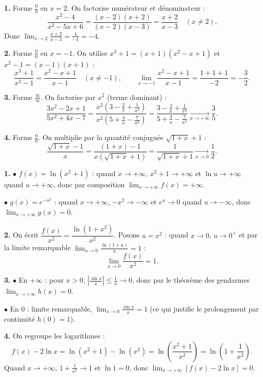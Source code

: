 \documentclass[11pt]{article}
\begin{document}
\begin{corrige}
\textbf{1.} Forme $\frac{0}{0}$ en $x = 2$. On factorise numérateur et dénominateur :
\[ \frac{x^2 - 4}{x^2 - 5x + 6} = \frac{(x-2)(x+2)}{(x-2)(x-3)} = \frac{x+2}{x-3} \quad (x \neq 2). \]
Donc $\displaystyle \lim_{x \to 2} \frac{x+2}{x-3} = \frac{4}{-1} = \boxed{-4}$.

\textbf{2.} Forme $\frac{0}{0}$ en $x = -1$. On utilise $x^3 + 1 = (x+1)(x^2 - x + 1)$ et $x^2 - 1 = (x-1)(x+1)$ :
\[ \frac{x^3 + 1}{x^2 - 1} = \frac{x^2 - x + 1}{x - 1} \quad (x \neq -1), \qquad \lim_{x \to -1} \frac{x^2 - x + 1}{x - 1} = \frac{1 + 1 + 1}{-2} = \boxed{-\frac{3}{2}}. \]

\textbf{3.} Forme $\frac{\infty}{\infty}$. On factorise par $x^2$ (terme dominant) :
\[ \frac{3x^2 - 2x + 1}{5x^2 + 4x - 7} = \frac{x^2\left(3 - \frac{2}{x} + \frac{1}{x^2}\right)}{x^2\left(5 + \frac{4}{x} - \frac{7}{x^2}\right)} = \frac{3 - \frac{2}{x} + \frac{1}{x^2}}{5 + \frac{4}{x} - \frac{7}{x^2}} \xrightarrow[x \to +\infty]{} \boxed{\frac{3}{5}}. \]

\textbf{4.} Forme $\frac{0}{0}$. On multiplie par la quantité conjuguée $\sqrt{1+x} + 1$ :
\[ \frac{\sqrt{1+x} - 1}{x} = \frac{(1+x) - 1}{x\left(\sqrt{1+x} + 1\right)} = \frac{1}{\sqrt{1+x} + 1} \xrightarrow[x \to 0]{} \boxed{\frac{1}{2}}. \]
\end{corrige}

\begin{corrige}
\textbf{1.} $\bullet$ $f(x) = \ln(x^2+1)$ : quand $x \to +\infty$, $x^2 + 1 \to +\infty$ et $\ln u \to +\infty$ quand $u \to +\infty$, donc par composition $\boxed{\lim_{x \to +\infty} f(x) = +\infty}$.

$\bullet$ $g(x) = e^{-x^2}$ : quand $x \to +\infty$, $-x^2 \to -\infty$ et $e^u \to 0$ quand $u \to -\infty$, donc $\boxed{\lim_{x \to +\infty} g(x) = 0}$.

\textbf{2.} On écrit $\dfrac{f(x)}{x^2} = \dfrac{\ln(1 + x^2)}{x^2}$. Posons $u = x^2$ : quand $x \to 0$, $u \to 0^+$ et par la limite remarquable $\lim_{u \to 0} \frac{\ln(1+u)}{u} = 1$ :
\[ \boxed{\lim_{x \to 0} \frac{f(x)}{x^2} = 1}. \]

\textbf{3.} $\bullet$ En $+\infty$ : pour $x > 0$, $\left|\frac{\sin x}{x}\right| \le \frac{1}{x} \to 0$, donc par le théorème des gendarmes $\boxed{\lim_{x \to +\infty} h(x) = 0}$.

$\bullet$ En $0$ : limite remarquable, $\boxed{\lim_{x \to 0} \frac{\sin x}{x} = 1}$ (ce qui justifie le prolongement par continuité $h(0) = 1$).

\textbf{4.} On regroupe les logarithmes :
\[ f(x) - 2\ln x = \ln(x^2 + 1) - \ln(x^2) = \ln\left(\frac{x^2 + 1}{x^2}\right) = \ln\left(1 + \frac{1}{x^2}\right). \]
Quand $x \to +\infty$, $1 + \frac{1}{x^2} \to 1$ et $\ln 1 = 0$, donc $\boxed{\lim_{x \to +\infty} \left[f(x) - 2\ln x\right] = 0}$.
\end{corrige}
\end{document}
